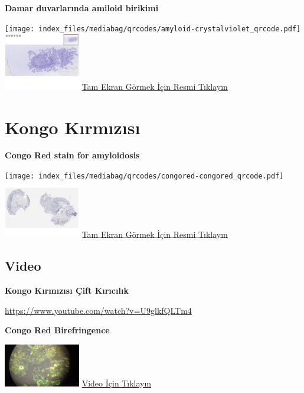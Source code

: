 \documentclass[
  letterpaper,
  DIV=11,
  numbers=noendperiod]{scrreprt}
\begin{document}
\textbf{Damar duvarlarında amiloid birikimi}

\texttt{[image: index\_files/mediabag/qrcodes/amyloid-crystalviolet\_qrcode.pdf]}
\href{https://images.patolojiatlasi.com/amyloid/crystalviolet.html}{\includegraphics[width=0.25\textwidth,height=\textheight]{./screenshots/thumbnail_crystalviolet.png}}
\href{https://images.patolojiatlasi.com/amyloid/crystalviolet.html}{Tam
Ekran Görmek İçin Resmi Tıklayın}

\hypertarget{sec-amiloidoz-kongo-kirmizisi}{%
\section{Kongo Kırmızısı}\label{sec-amiloidoz-kongo-kirmizisi}}

\textbf{Congo Red stain for amyloidosis}

\texttt{[image: index\_files/mediabag/qrcodes/congored-congored\_qrcode.pdf]}
\href{https://images.patolojiatlasi.com/congored/congored.html}{\includegraphics[width=0.25\textwidth,height=\textheight]{./screenshots/thumbnail_congored.png}}
\href{https://images.patolojiatlasi.com/congored/congored.html}{Tam
Ekran Görmek İçin Resmi Tıklayın}

\hypertarget{video}{%
\subsection{Video}\label{video}}

\textbf{Kongo Kırmızısı Çift Kırıcılık}

\url{https://www.youtube.com/watch?v=U9glkfQLTm4}

\textbf{Congo Red Birefringence}

\href{https://www.youtube.com/watch?v=U9glkfQLTm4}{\includegraphics[width=0.25\textwidth,height=\textheight]{./screenshots/thumbnail_congored_video.png}}
\href{https://www.youtube.com/watch?v=U9glkfQLTm4}{Video İçin Tıklayın}
\end{document}
